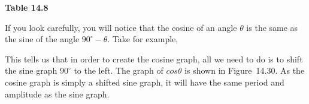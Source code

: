 {\begin{center}
\begin{xtabular*}{\mytablewidth}[t]{|p{10\mystarwidth}|p{10\mystarwidth}|p{10\mystarwidth}|p{10\mystarwidth}|p{10\mystarwidth}|p{10\mystarwidth}|p{10\mystarwidth}|}
     \tabularnewline{}
    \end{xtabular*}
      \end{center}
    \begin{center}{\small\bfseries Table 14.8}\end{center}
        }%
    \par
        \label{m39414*id87173}If you look carefully, you will notice that the cosine of an angle $\theta $ is the same as the sine of the angle ${90}^{\circ }-\theta $. Take for example,\par 
        \label{m39414*id87206}\nopagebreak\noindent{}
        \label{m39414*id87280}This tells us that in order to create the cosine graph, all we need to do is to shift the sine graph ${90}^{\circ }$ to the left. The graph of $cos\theta $ is shown in Figure~14.30. As the cosine graph is simply a shifted sine graph, it will have the same period and amplitude as the sine graph.\par 

